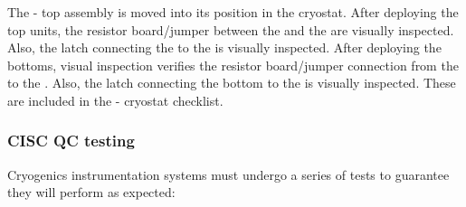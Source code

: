 The - top assembly is moved into its position in the cryostat.   
After deploying the  top units, the resistor board/jumper between the  and the   are visually inspected.  
Also, the latch connecting the  to the   is visually inspected.  After deploying the  bottoms, visual inspection verifies the resistor board/jumper connection from the  to the .  
Also, the latch connecting the  bottom to the  is visually inspected.  
These are included in the - cryostat checklist.



\subsubsection{CISC QC testing}

Cryogenics instrumentation systems must undergo a series of tests to guarantee they will perform as expected: 

